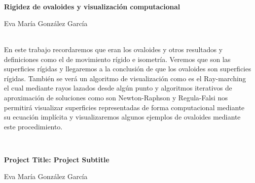 \chapter*{}






\cleardoublepage
\thispagestyle{empty}

\begin{center}
{\large\bfseries Rigidez de ovaloides y visualización computacional}\\
\end{center}
\begin{center}
Eva María González García\\
\end{center}


\vspace{0.7cm}
\\

En este trabajo recordaremos que eran los ovaloides y otros resultados y definiciones como el de movimiento rígido e isometría. Veremos que son las superficies rígidas y llegaremos a la conclusión de que los ovaloides son superficies rígidas. También se verá un algoritmo de visualización como es el Ray-marching el cual mediante rayos lazados desde algún punto y algoritmos iterativos de aproximación de soluciones como son Newton-Raphson y Regula-Falsi nos permitirá visualizar superficies representadas de forma computacional mediante su ecuación implícita y visualizaremos algunos ejemplos de ovaloides mediante este procedimiento.


\vspace{0.7cm}
\\
\cleardoublepage


\thispagestyle{empty}


\begin{center}
{\large\bfseries Project Title: Project Subtitle}\\
\end{center}
\begin{center}
Eva María González García\\
\end{center}

\vspace{0.7cm}
\\


